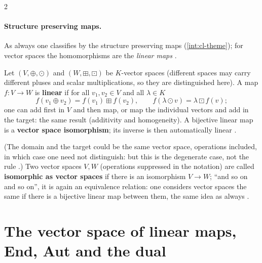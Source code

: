 \begin{paracol}{2}
\paragraph{Structure preserving maps.} As always one classifies by the structure preserving maps (\cref{int:cl-theme}); for vector spaces the homomorphisms are the \emph{linear maps} .
\begin{definition}\label{def:te-linear}
Let $(V,\oplus,\odot)$ and $(W,\boxplus,\boxdot)$ be $K$-vector spaces (different spaces may carry different pluses and scalar multiplications, so they are distinguished here). A map $f\colon V\to W$ is \textbf{linear} if for all $v_1,v_2\in V$ and all $\lambda\in K$
\[
  f(v_1\oplus v_2)=f(v_1)\boxplus f(v_2),\qquad f(\lambda\odot v)=\lambda\boxdot f(v);
\]
one can add first in $V$ and then map, or map the individual vectors and add in the target: the same result (additivity and homogeneity). A bijective linear map is a \textbf{vector space isomorphism}; its inverse is then automatically linear .
\end{definition}
(The domain and the target could be the same vector space, operations included, in which case one need not distinguish: but this is the degenerate case, not the rule .) Two vector spaces $V,W$ (operations suppressed in the notation) are called \textbf{isomorphic as vector spaces} if there is an isomorphism $V\to W$;
``and so on and so on'', it is again an equivalence relation: one considers vector spaces the same if there is a bijective linear map between them, the same idea as always .

\section{The vector space of linear maps, End, Aut and the dual}\label{sec:te-hom}


\end{paracol}
